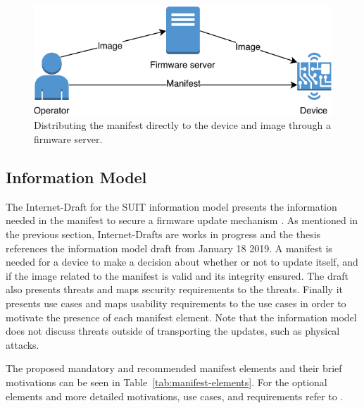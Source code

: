\documentclass[0-thesis.tex]{subfiles}
\begin{document}
\begin{figure}
    \caption{Distributing the manifest directly to the device and image through a firmware server.}
    \label{fig:manifest-image-separate-distribution}
    \includegraphics{images/separate.pdf}
\end{figure}

\subsection{Information Model}
\label{ssec:information-model}
The Internet-Draft for the SUIT information model presents the information needed in the
manifest to secure a firmware update mechanism \parencite{suit-information-model}. As
mentioned in the previous section, Internet-Drafts are works in progress and the thesis
references the information model draft from January 18 2019. A manifest is needed for a
device to make a decision about whether or not to update itself, and if the image related
to the manifest is valid and its integrity ensured. The draft also presents threats and
maps security requirements to the threats. Finally it presents use cases and maps
usability requirements to the use cases in order to motivate the presence of each manifest
element. Note that the information model does not discuss threats outside of transporting
the updates, such as physical attacks.

The proposed mandatory and recommended manifest elements and their brief motivations can
be seen in Table~\ref{tab:manifest-elements}. For the optional elements and more detailed
motivations, use cases, and requirements refer to \parencite{suit-information-model}.
\end{document}
